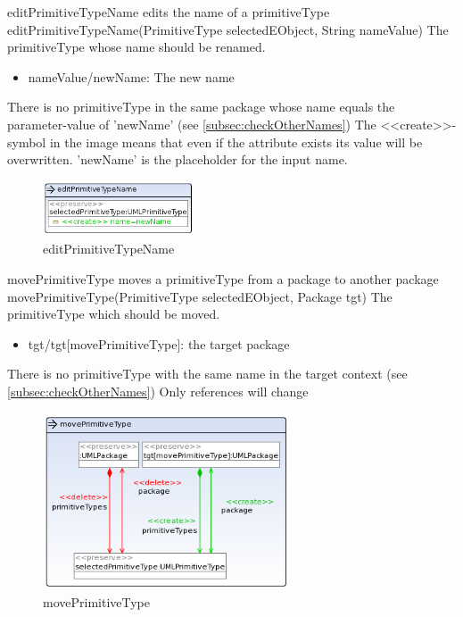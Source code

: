 \op
{editPrimitiveTypeName}
{edits the name of a primitiveType}
{editPrimitiveTypeName(PrimitiveType selectedEObject, String nameValue)}
{The primitiveType whose name should be renamed.}
{
\begin{itemize}
 \item nameValue/newName: The new name
\end{itemize}
}
{There is no primitiveType in the same package whose name equals the parameter-value of
'newName' (see \ref{subsec:checkOtherNames})}
{The \textless\textless create\textgreater\textgreater  -symbol in the image
means that even if the attribute exists its value will be overwritten.
'newName' is the placeholder for the input name.}
\begin{figure}[H]
  \centering
  \includegraphics[width=0.4\textwidth]{pics/editPrimitiveTypeName.png}
  \caption{editPrimitiveTypeName}
  \label{editPrimitiveTypeName}
\end{figure}
\op
{movePrimitiveType}
{moves a primitiveType from a package to another package}
{movePrimitiveType(PrimitiveType selectedEObject, Package tgt)}
{The primitiveType which should be moved.}
{
\begin{itemize}
 \item tgt/tgt[movePrimitiveType]: the target package
\end{itemize}
}
{There is no primitiveType with the same name in the target context (see
\ref{subsec:checkOtherNames})}
{Only references will change}
\begin{figure}[H]
  \centering
  \includegraphics[width=0.65\textwidth]{pics/movePrimitiveType.png}
  \caption{movePrimitiveType}
  \label{movePrimitiveType}
\end{figure}